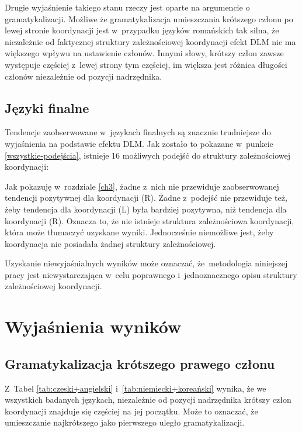 Drugie wyjaśnienie takiego stanu rzeczy jest oparte na argumencie o gramatykalizacji. Możliwe że gramatykalizacja umieszczania krótszego członu po lewej stronie koordynacji jest w~przypadku języków romańskich tak silna, że niezależnie od faktycznej struktury zależnościowej koordynacji efekt DLM nie ma większego wpływu na ustawienie członów. Innymi słowy, krótszy człon zawsze występuje częściej z~lewej strony tym częściej, im większa jest różnica długości członów niezależnie od pozycji nadrzędnika.

\subsection{Języki finalne}

Tendencje zaobserwowane w~językach finalnych są znacznie trudniejsze do wyjaśnienia na podstawie efektu DLM. Jak zostało to pokazane w~punkcie \ref{wszystkie-podejścia}, istnieje 16 możliwych podejść do struktury zależnościowej koordynacji:



Jak pokazuję w~rozdziale \ref{ch3}, żadne z~nich nie przewiduje zaobserwowanej tendencji pozytywnej dla koordynacji (R). Żadne z~podejść nie przewiduje też, żeby tendencja dla koordynacji (L) była bardziej pozytywna, niż tendencja dla koordynacji (R). Oznacza to, że nie istnieje struktura zależnościowa koordynacji, która może tłumaczyć uzyskane wyniki. Jednocześnie niemożliwe jest, żeby koordynacja nie posiadała żadnej struktury zależnościowej. 

Uzyskanie niewyjaśnialnych wyników może oznaczać, że~metodologia niniejszej pracy jest niewystarczająca w~celu poprawnego i~jednoznacznego opisu struktury zależnościowej koordynacji.

\section{Wyjaśnienia wyników}

\subsection{Gramatykalizacja krótszego prawego członu} \label{gramatykalizacja}

Z~Tabel \ref{tab:czeski+angielski} i~\ref{tab:niemiecki+koreański} wynika, że we wszystkich badanych językach, niezależnie od pozycji nadrzędnika krótszy człon koordynacji znajduje się częściej na jej początku. Może to oznaczać, że umieszczanie najkrótszego jako pierwszego uległo gramatykalizacji.

